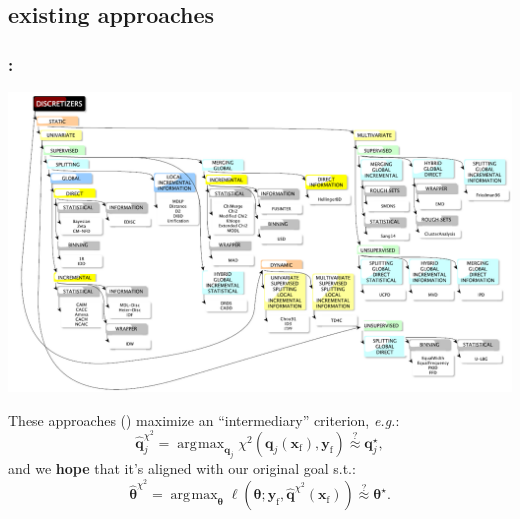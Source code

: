 \documentclass[english,xcolor={rgb,dvipsnames,table,usenames}]{beamer}
\DeclareMathOperator*{\argmax}{\arg\!\max}
\newcommand\q{{\bm{q}}}
\begin{document}
\subsection{existing approaches}
\begin{frame}
\frametitle{\secname: \subsecname}

\vspace*{-0.25cm}
\begin{center}
\includegraphics[scale=0.3]{figures/taxonomy.PNG}
\end{center}
\vspace*{-0.2cm}
These approaches (\cite{wrapper2}) maximize an ``intermediary'' criterion, \textit{e.g.}:
\vspace*{-0.1cm}
\[ \hat{\q}_j^{\chi^2} = \argmax_{\q_j} \chi^2(\q_j(\mathbf{x}_\text{f}), \mathbf{y}_\text{f}) \stackrel{?}{\approx} \q^\star_j, \]
\vspace*{-0.1cm}
and we {\bf hope} that it's aligned with our original goal s.t.:
\vspace*{-0.1cm}
\[ \hat{\bm{\theta}}^{\chi^2} = \argmax_{\bm{\theta}} \ell(\bm{\theta} ; \mathbf{y}_\text{f}, {\hat{\q}^{\chi^2}}(\mathbf{x}_\text{f})) \stackrel{?}{\approx} \bm{\theta}^\star. \]

\end{frame}
\end{document}
